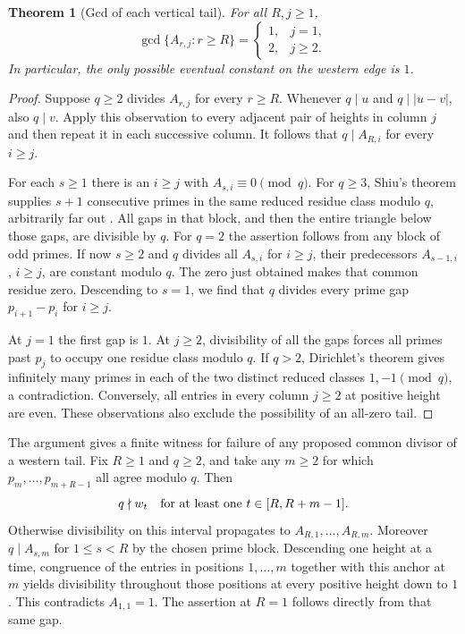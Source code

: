 \documentclass[11pt,a4paper]{article}
\newtheorem{theorem}{Theorem}[section]
\begin{document}
\begin{theorem}[Gcd of each vertical tail]
For all $R,j\ge1$,
\[
 \gcd\{A_{r,j}:r\ge R\}=
 \begin{cases}1,&j=1,\\2,&j\ge2.\end{cases}
\]
In particular, the only possible eventual constant on the western edge is $1$.
\end{theorem}
\begin{proof}
Suppose $q\ge2$ divides $A_{r,j}$ for every $r\ge R$.
Whenever $q\mid u$ and $q\mid |u-v|$, also $q\mid v$.
Apply this observation to every adjacent pair of heights in column $j$
and then repeat it in each successive column. It follows that
$q\mid A_{R,i}$ for every $i\ge j$.

For each $s\ge1$ there is an $i\ge j$ with $A_{s,i}\equiv0\pmod q$.
For $q\ge3$, Shiu's theorem supplies $s+1$ consecutive primes in
the same reduced residue class modulo $q$, arbitrarily far out
\cite{shiu}. All gaps in that block, and then the entire triangle
below those gaps, are divisible by $q$. For $q=2$ the assertion follows
from any block of odd primes. If now $s\ge2$ and $q$ divides all
$A_{s,i}$ for $i\ge j$, their predecessors $A_{s-1,i}$, $i\ge j$,
are constant modulo $q$. The zero just obtained makes that common
residue zero. Descending to $s=1$, we find that $q$ divides every
prime gap $p_{i+1}-p_i$ for $i\ge j$.

At $j=1$ the first gap is $1$. At $j\ge2$, divisibility of all the
gaps forces all primes past $p_j$ to occupy one residue class modulo
$q$. If $q>2$, Dirichlet's theorem gives infinitely many primes in
each of the two distinct reduced classes $1,-1\pmod q$, a
contradiction. Conversely, all entries in every column $j\ge2$ at
positive height are even. These observations also exclude the
possibility of an all-zero tail.
\end{proof}

The argument gives a finite witness for failure of any proposed common
divisor of a western tail. Fix $R\ge1$ and $q\ge2$, and take any $m\ge2$
for which $p_m,\ldots,p_{m+R-1}$ all agree modulo $q$.
Then
\[
    q\nmid w_t\quad\hbox{for at least one }t\in[R,R+m-1].
\]
Otherwise divisibility on this interval propagates to
$A_{R,1},\ldots,A_{R,m}$. Moreover $q\mid A_{s,m}$ for
$1\le s<R$ by the chosen prime block. Descending one height at a
time, congruence of the entries in positions $1,\ldots,m$ together
with this anchor at $m$ yields divisibility throughout those positions
at every positive height down to $1$. This contradicts $A_{1,1}=1$.
The assertion at $R=1$ follows directly from that same gap.
\end{document}
